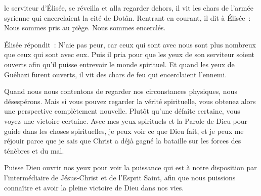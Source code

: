 


 le serviteur d'Élisée, se réveilla
 et alla regarder dehors, il vit les chars de l'armée syrienne
 qui encerclaient la cité de Dotân.
 Rentrant en courant, il dit à Élisée~:
 \og Nous sommes pris au piège. Nous sommes encerclés. \fg{}

Élisée répondit~:
 \og N'aie pas peur, car ceux qui sont avec nous sont plus nombreux
 que ceux qui sont avec eux. \fg{}
 Puis il pria pour que les yeux de son serviteur soient ouverts
 afin qu'il puisse entrevoir le monde spirituel.
 Et quand les yeux de Guéhazi furent ouverts,
 il vit des chars de feu qui encerclaient l'ennemi. 


Quand nous nous contentons de regarder nos circonstances physiques,
 nous désespérons. Mais si vous pouvez regarder la vérité spirituelle,
 vous obtenez alors une perspective complètement nouvelle.
 Plutôt qu'une défaite certaine, vous voyez une victoire certaine.
 Avec mes yeux spirituels et la Parole de Dieu pour guide
 dans les choses spirituelles, je peux voir ce que Dieu fait,
 et je peux me réjouir parce que je sais que Christ a déjà gagné
 la bataille sur les forces des ténèbres et du mal. 

Puisse Dieu ouvrir nos yeux pour voir la puissance qui est à notre
 disposition par l'intermédiaire de Jésus-Christ et de l'Esprit Saint,
 afin que nous puissions connaître et avoir la pleine victoire de Dieu
 dans nos vies. 

\dvrule







